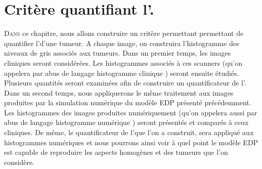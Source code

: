 \documentclass[main.tex]{subfiles}
\begin{document}



\chapter{Critère quantifiant l'\hetero.}
\lettrine[lines=2, lhang=0.33, loversize=0.25]{D}{ans} ce chapitre, nous allons construire un critère permettant permettant de quantifier l'\hetero d'une tumeur.
A chaque image, on construira l'histogramme des niveaux de gris associés aux tumeurs. 
Dans un premier temps, les images cliniques seront considérées. Les histogrammes associés à ces scanners (qu'on appelera par abus de langage \og histogramme clinique \fg) seront ensuite étudiés. Plusieurs quantités seront examinées afin de construire un quantificateur de l'\hetero.
Dans un second temps, nous appliquerons le même traitement aux images produites par la simulation numérique du modèle EDP présenté précédemment. Les histogrammes des images produites numériquement (qu'on appelera aussi par abus de langage \og histogramme numérique \fg) seront présentés et comparés à ceux cliniques. De même, le quantificateur de l'\hetero que l'on a construit, sera appliqué aux histogrammes numériques et nous pourrons ainsi voir à quel point le modèle EDP est capable de reproduire les aspects homogènes et \heterogenes des tumeurs que l'on considère.
\end{document}
